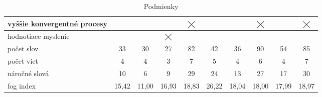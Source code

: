 \begin{table}[ht]
\begin{adjustbox}{width=0.9\textwidth}
\begin{tabular}{|l|c|c|c|c|c|c|c|c|c|}
vyššie konvergentné procesy        &  &  &  & $\bigtimes$  &  &  & $\bigtimes$ & & $\bigtimes$ \\ \hline
hodnotiace myslenie                & &  & $\bigtimes$  &  &   &  &  & & \\ \Xhline{4\arrayrulewidth}
počet slov  & 33 & 30 & 27  & 82  & 42  &  36 & 90 & 54 & 85 \\ \hline
počet viet  & 4 & 4 &  3 &  7 &  5 & 4 & 6 & 4 & 7 \\ \hline
náročné slová & 10 & 6 & 9 & 29  & 24 & 13  & 27 & 17 & 30 \\ \hline
fog index                          & 15,42  & 11,00  & 16,93  &  18,83 & 26,22  & 18,04 &  18,00 & 17,99 & 18,97 \\ \hline
\end{tabular}
\end{adjustbox}
\caption{Podmienky}
\end{table} 

